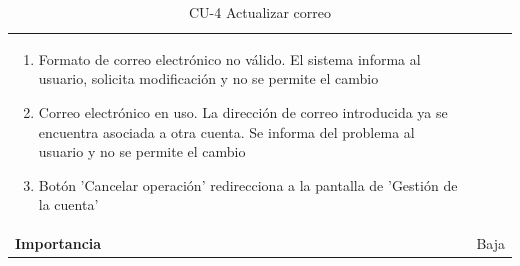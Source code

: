 \begin{table}[p]
\begin{tabularx}{\linewidth}{ p{} p{} }
\begin{enumerate}
                \item Formato de correo electrónico no válido. El sistema informa al usuario, solicita modificación y no se permite el cambio
                \item Correo electrónico en uso. La dirección de correo introducida ya se encuentra asociada a otra cuenta. Se informa del problema al usuario y no se permite el cambio
                \item Botón 'Cancelar operación' redirecciona a la pantalla de 'Gestión de la cuenta'
		\end{enumerate}\\
		\textbf{Importancia}          & Baja \\
		\bottomrule
	\end{tabularx}
	\caption{CU-4 Actualizar correo}
    \label{CU-4}
\end{table}

